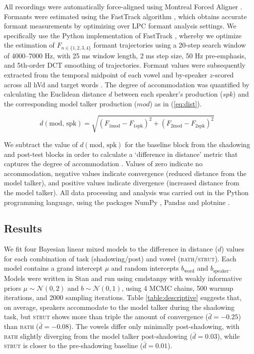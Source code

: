 \documentclass[10pt,letterpaper]{article}
\begin{document}
All recordings were automatically force-aligned using Montreal Forced Aligner \citep{mcauliffe-etal2017}. Formants were estimated using the FastTrack algorithm \citep{barreda2021}, which obtains accurate formant measurements by optimizing over LPC formant analysis settings. We specifically use the Python implementation of FastTrack \citep{fruehwald_fasttrackpy}, whereby we optimize the estimation of $F_{n \in \{1, 2, 3, 4\}}$ formant trajectories using a 20-step search window of 4000--7000 Hz, with 25 ms window length, 2 ms step size, 50 Hz pre-emphasis, and 5th-order DCT smoothing of trajectories. Formant values were subsequently extracted from the temporal midpoint of each vowel and by-speaker $z$-scored across all hVd and target words \citep{babel2012}. The degree of accommodation was quantified by calculating the Euclidean distance $d$ between each speaker's production ($spk$) and the corresponding model talker production ($mod$) as in (\ref{eq:dist}).

\begin{equation}
d(\text{mod, spk}) = \sqrt{(F_{1 \text{mod}} - F_{1\text{spk}})^2 + (F_{2\text{mod}} - F_{2\text{spk}})^2}
\label{eq:dist}
\end{equation}

We subtract the value of $d(\text{mod, spk})$ for the baseline block from the shadowing and post-test blocks in order to calculate a `difference in distance' metric that captures the degree of accommodation \citep{babel2012}. Values of zero indicate no accommodation, negative values indicate convergence (reduced distance from the model talker), and positive values indicate divergence (increased distance from the model talker). All data processing and analysis was carried out in the Python programming language, using the packages NumPy \citep{harris2020}, Pandas \citep{pandas} and plotnine \citep{plotnine}.


\subsection{Results}

We fit four Bayesian linear mixed models to the difference in distance ($d$) values for each combination of task (shadowing/post) and vowel (\textsc{bath/strut}). Each model contains a grand intercept $\mu$ and random intercepts $b_{\text{word}}$ and $b_{\text{speaker}}$. Models were written in Stan and run using cmdstanpy \citep{stan2024} with weakly informative priors $\mu \sim \mathcal{N}(0, 2)$ and $b \sim \mathcal{N}(0, 1)$, using 4 MCMC chains, 500 warmup iterations, and 2000 sampling iterations. Table \ref{table:descriptive} suggests that, on average, speakers accommodate to the model talker during the shadowing task, but \textsc{strut} shows more than triple the amount of convergence ($\bar{d} = -0.25$) than \textsc{bath} ($\bar{d} = -0.08$). The vowels differ only minimally post-shadowing, with \textsc{bath} slightly diverging from the model talker post-shadowing ($\bar{d} = 0.03$), while \textsc{strut} is closer to the pre-shadowing baseline ($\bar{d} = 0.01$).
\end{document}
